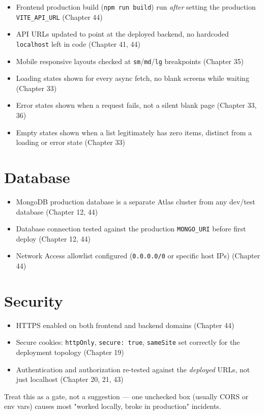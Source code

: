 \begin{itemize}
\item[$\square$] Frontend production build (\texttt{npm run build}) run
\emph{after} setting the production \texttt{VITE\_API\_URL} (Chapter 44)
\item[$\square$] API URLs updated to point at the deployed backend, no
hardcoded \texttt{localhost} left in code (Chapter 41, 44)
\item[$\square$] Mobile responsive layouts checked at \texttt{sm}/\texttt{md}/\texttt{lg}
breakpoints (Chapter 35)
\item[$\square$] Loading states shown for every async fetch, no blank
screens while waiting (Chapter 33)
\item[$\square$] Error states shown when a request fails, not a silent
blank page (Chapter 33, 36)
\item[$\square$] Empty states shown when a list legitimately has zero
items, distinct from a loading or error state (Chapter 33)
\end{itemize}

\section{Database}

\begin{itemize}
\item[$\square$] MongoDB production database is a separate Atlas cluster
from any dev/test database (Chapter 12, 44)
\item[$\square$] Database connection tested against the production
\texttt{MONGO\_URI} before first deploy (Chapter 12, 44)
\item[$\square$] Network Access allowlist configured (\texttt{0.0.0.0/0}
or specific host IPs) (Chapter 44)
\end{itemize}

\section{Security}

\begin{itemize}
\item[$\square$] HTTPS enabled on both frontend and backend domains
(Chapter 44)
\item[$\square$] Secure cookies: \texttt{httpOnly}, \texttt{secure: true},
\texttt{sameSite} set correctly for the deployment topology (Chapter 19)
\item[$\square$] Authentication and authorization re-tested against the
\emph{deployed} URLs, not just localhost (Chapter 20, 21, 43)
\end{itemize}

\begin{tipbox}[TIP]
Treat this as a gate, not a suggestion --- one unchecked box (usually CORS or env vars) causes most "worked locally, broke in production" incidents.
\end{tipbox}
